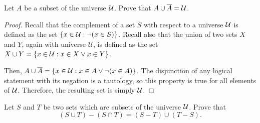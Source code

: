 \documentclass{agony}
\begin{document}

\question Let $A$ be a subset of the universe $\mathcal{U}$.
Prove that $A \cup \overline{A} = \mathcal{U}$.

\begin{proof}
  Recall that the complement of a set $\overline{S}$ with respect to a universe $\mathcal{U}$
  is defined as the set $\{x\in\mathcal{U}:\lnot(x\in S)\}$.
  Recall also that the union of two sets $X$ and $Y$, again with universe $\mathcal U$,
  is defined as the set $X\cup Y=\{x\in\mathcal{U}:x\in X\lor x\in Y\}$.

  Then, $A \cup \overline{A} = \{x\in\mathcal{U}:x \in A \lor \lnot (x \in A)\}$.
  The disjunction of any logical statement with its negation is a tautology, so this property is true for all elements of $\mathcal{U}$.
  Therefore, the resulting set is simply $\mathcal{U}$.
\end{proof}


\question\label{distribute} Let $S$ and $T$ be two sets which are subsets of the universe $\mathcal{U}$.
Prove that \[ (S \cup T) - (S \cap T) = (S - T) \cup (T - S). \]
\end{document}
